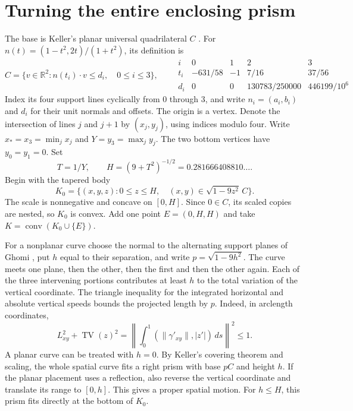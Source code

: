\section{Turning the entire enclosing prism}
The base is Keller's planar universal quadrilateral $C$ \cite[Theorem 4.1]{keller}. For $n(t)=(1-t^2,2t)/(1+t^2)$, its definition is
\[
 C=\{v\in\mathbb R^2:n(t_i)\cdot v\le d_i,\quad 0\le i\le3\},\qquad
 \begin{array}{c|rrrr}
 i&0&1&2&3\\ \hline
 t_i&-631/58&-1&7/16&37/56\\
 d_i&0&0&130783/250000&446199/10^6
 \end{array}
\]
 Index its four support lines cyclically from
$0$ through $3$, and write $n_i=(a_i,b_i)$ and $d_i$ for their unit
normals and offsets. The origin
is a vertex. Denote the intersection of lines $j$ and $j+1$ by $(x_j,y_j)$,
using indices modulo four. Write $x_* = x_3=\min_jx_j$ and
$Y=y_3=\max_j y_j$. The two bottom vertices have $y_0=y_1=0$.
Set
\[
 T=1/Y,\qquad H=(9+T^2)^{-1/2}=0.281666408810\ldots.
\]
Begin with the tapered body
\[
 K_0=\{(x,y,z):0\le z\le H,\quad(x,y)\in\sqrt{1-9z^2}\,C\}.
\]
The scale is nonnegative and concave on $[0,H]$. Since $0\in C$,
its scaled copies are nested, so $K_0$ is convex. Add one point $E=(0,H,H)$ and take $K=\operatorname{conv}(K_0\cup\{E\})$.

For a nonplanar curve choose the normal to the alternating support planes of Ghomi \cite[Corollary 3.2]{ghomi}, put $h$ equal to their separation, and write
$p=\sqrt{1-9h^2}$. The curve meets one plane, then the other, then the first and then the other again. Each of the three intervening portions contributes at least $h$ to the total variation of the vertical coordinate. The triangle inequality for the integrated horizontal and absolute
vertical speeds bounds the projected length by $p$. Indeed, in arclength coordinates,
\[
  L_{xy}^2+\operatorname{TV}(z)^2=
  \left\|\int_0^1 (\|\gamma'_{xy}\|,|z'|)\,ds\right\|^2\le1 .
\] A planar curve can
be treated with $h=0$. By Keller's covering theorem and scaling, the whole
spatial curve fits a right prism with base $p C$ and height $h$. If the
planar placement uses a reflection, also reverse the vertical coordinate
and translate its range to $[0,h]$. This gives a proper spatial motion.
For $h\le H$, this prism fits directly at the bottom of $K_0$.

